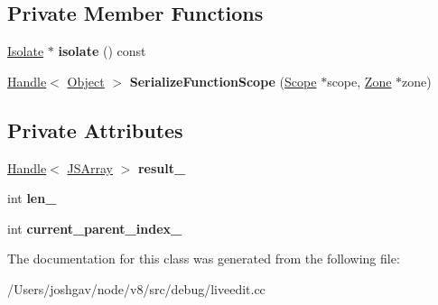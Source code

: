 \subsection*{Private Member Functions}
\begin{DoxyCompactItemize}
\item 
\hyperlink{classv8_1_1internal_1_1_isolate}{Isolate} $\ast$ {\bfseries isolate} () const \hypertarget{classv8_1_1internal_1_1_function_info_listener_ac47620389cb7b672c00fac856b20e6a8}{}\label{classv8_1_1internal_1_1_function_info_listener_ac47620389cb7b672c00fac856b20e6a8}

\item 
\hyperlink{classv8_1_1internal_1_1_handle}{Handle}$<$ \hyperlink{classv8_1_1internal_1_1_object}{Object} $>$ {\bfseries Serialize\+Function\+Scope} (\hyperlink{classv8_1_1internal_1_1_scope}{Scope} $\ast$scope, \hyperlink{classv8_1_1internal_1_1_zone}{Zone} $\ast$zone)\hypertarget{classv8_1_1internal_1_1_function_info_listener_a18de95b5fe943f703d8de456187a6bfa}{}\label{classv8_1_1internal_1_1_function_info_listener_a18de95b5fe943f703d8de456187a6bfa}

\end{DoxyCompactItemize}
\subsection*{Private Attributes}
\begin{DoxyCompactItemize}
\item 
\hyperlink{classv8_1_1internal_1_1_handle}{Handle}$<$ \hyperlink{classv8_1_1internal_1_1_j_s_array}{J\+S\+Array} $>$ {\bfseries result\+\_\+}\hypertarget{classv8_1_1internal_1_1_function_info_listener_aa245b4c21aa4caccfb0dd91059ed0321}{}\label{classv8_1_1internal_1_1_function_info_listener_aa245b4c21aa4caccfb0dd91059ed0321}

\item 
int {\bfseries len\+\_\+}\hypertarget{classv8_1_1internal_1_1_function_info_listener_a644285b58583567dee02a45698d5c380}{}\label{classv8_1_1internal_1_1_function_info_listener_a644285b58583567dee02a45698d5c380}

\item 
int {\bfseries current\+\_\+parent\+\_\+index\+\_\+}\hypertarget{classv8_1_1internal_1_1_function_info_listener_a02b2a62dc6c998e64ca4b8f5d3fa3590}{}\label{classv8_1_1internal_1_1_function_info_listener_a02b2a62dc6c998e64ca4b8f5d3fa3590}

\end{DoxyCompactItemize}


The documentation for this class was generated from the following file\+:\begin{DoxyCompactItemize}
\item 
/\+Users/joshgav/node/v8/src/debug/liveedit.\+cc\end{DoxyCompactItemize}
